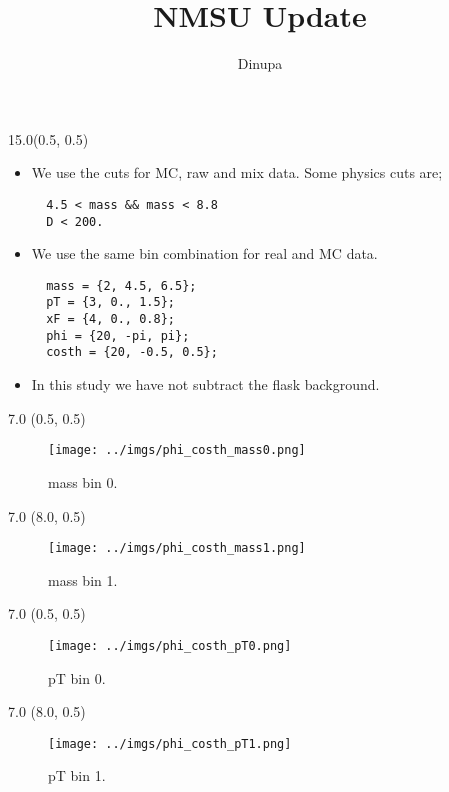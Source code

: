 \documentclass[12pt, xcolor={dvipsnames}, aspectratio = 169, sans,mathserif]{beamer}
\title{NMSU Update}
\author{Dinupa}
\newenvironment{List}[2]
{
\begin{textblock}{#1}#2
\begin{itemize}
}
{
\end{itemize}
\end{textblock}
}
\newenvironment{Pic}[2]
{
\begin{textblock}{#1} #2
\begin{figure}
}
{
\end{figure}
\end{textblock}
}
\begin{document}
\begin{frame}
    \maketitle
\end{frame}

\begin{frame}[fragile]
\begin{List}{15.0}{(0.5, 0.5)}

  \item We use the cuts for MC, raw and mix data. Some physics cuts are;
  \begin{verbatim}
  4.5 < mass && mass < 8.8
  D < 200.
  \end{verbatim}

  \item We use the same bin combination for real and MC data.
  \begin{verbatim}
  mass = {2, 4.5, 6.5};
  pT = {3, 0., 1.5};
  xF = {4, 0., 0.8};
  phi = {20, -pi, pi};
  costh = {20, -0.5, 0.5};
  \end{verbatim}

  \item In this study we have not subtract the flask background.

\end{List}
\end{frame}

%
%
%
\begin{frame}
\begin{Pic}{7.0}{(0.5, 0.5)}
  \texttt{[image: ../imgs/phi\_costh\_mass0.png]}
  \caption{mass bin 0.}
\end{Pic}

\begin{Pic}{7.0}{(8.0, 0.5)}
  \texttt{[image: ../imgs/phi\_costh\_mass1.png]}
  \caption{mass bin 1.}
\end{Pic}
\end{frame}

%
%
%
\begin{frame}
\begin{Pic}{7.0}{(0.5, 0.5)}
  \texttt{[image: ../imgs/phi\_costh\_pT0.png]}
  \caption{pT bin 0.}
\end{Pic}

\begin{Pic}{7.0}{(8.0, 0.5)}
  \texttt{[image: ../imgs/phi\_costh\_pT1.png]}
  \caption{pT bin 1.}
\end{Pic}
\end{frame}
\end{document}
